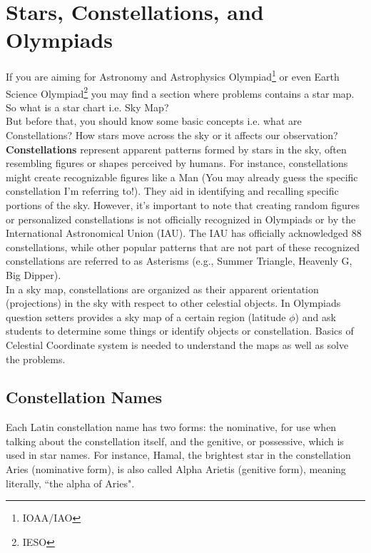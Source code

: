\documentclass[a4paper,12pt]{extarticle}
\begin{document}
\section{Stars, Constellations, and Olympiads}
 
If you are aiming for Astronomy and Astrophysics Olympiad\footnote{IOAA/IAO} or even Earth Science Olympiad\footnote{IESO} you may find a section  where problems contains a star map. So what is a star chart i.e. Sky Map?\\

But before that, you should know some basic concepts i.e. what are Constellations? How stars move across the sky or it affects our observation? \\

\textbf{Constellations} represent apparent patterns formed by stars in the sky, often resembling figures or shapes perceived by humans. For instance, constellations might create recognizable figures like a Man (You may already guess the specific constellation I'm referring to!). They aid in identifying and recalling specific portions of the sky. However, it's important to note that creating random figures or personalized constellations is not officially recognized in Olympiads or by the International Astronomical Union (IAU). The IAU has officially acknowledged 88 constellations, while other popular patterns that are not part of these recognized constellations are referred to as Asterisms (e.g., Summer Triangle, Heavenly G, Big Dipper).\\

In a sky map, constellations are organized as their apparent orientation (projections) in the sky with respect to other celestial objects. In Olympiads question setters provides a sky map of a certain region (latitude $\phi$) and ask students to determine some things or identify objects or constellation. Basics of Celestial Coordinate system is needed to understand the maps as well as solve the problems.

\subsection{Constellation Names}

Each Latin constellation name has two forms: the nominative, for use when talking about the constellation itself, and the genitive, or possessive, which is used in star names. For instance, Hamal, the brightest star in the constellation Aries (nominative form), is also called Alpha Arietis (genitive form), meaning literally, ``the alpha of Aries".\\
\end{document}
